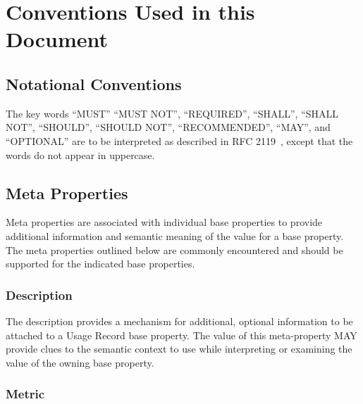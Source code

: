 
\section{Conventions Used in this Document}
\label{s:conventions}

\subsection{Notational Conventions}
\label{s:rfc2119}

The key words ``MUST'' ``MUST NOT'', ``REQUIRED'', ``SHALL'', ``SHALL NOT'', ``SHOULD'', ``SHOULD NOT'', ``RECOMMENDED'', ``MAY'',  and ``OPTIONAL'' are to be interpreted as described in RFC 2119~\cite{rfc2119}, except that the words do not appear in uppercase. 






\subsection{Meta Properties}

Meta properties are associated with individual base properties to provide additional information and semantic meaning of the value for a base property.  The meta properties outlined below are commonly encountered and should be supported for the indicated base properties.






\subsubsection{Description}

The description provides a mechanism for additional, optional information to be attached to a Usage Record base property.  The value of this meta-property MAY provide clues to the semantic context to use while interpreting or examining the value of the owning base property.






\subsubsection{Metric}

